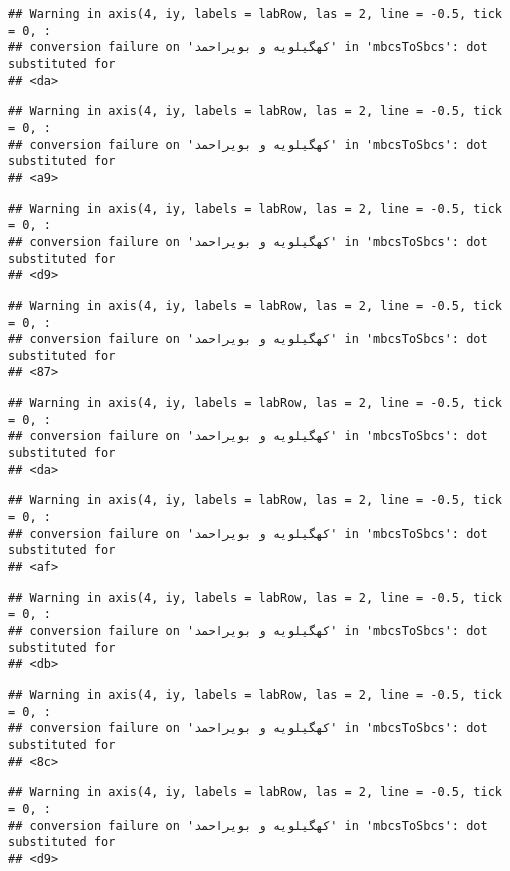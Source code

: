 \documentclass[
]{article}
\begin{document}
\begin{verbatim}
## Warning in axis(4, iy, labels = labRow, las = 2, line = -0.5, tick = 0, :
## conversion failure on 'کهگیلویه و بویراحمد' in 'mbcsToSbcs': dot substituted for
## <da>
\end{verbatim}

\begin{verbatim}
## Warning in axis(4, iy, labels = labRow, las = 2, line = -0.5, tick = 0, :
## conversion failure on 'کهگیلویه و بویراحمد' in 'mbcsToSbcs': dot substituted for
## <a9>
\end{verbatim}

\begin{verbatim}
## Warning in axis(4, iy, labels = labRow, las = 2, line = -0.5, tick = 0, :
## conversion failure on 'کهگیلویه و بویراحمد' in 'mbcsToSbcs': dot substituted for
## <d9>
\end{verbatim}

\begin{verbatim}
## Warning in axis(4, iy, labels = labRow, las = 2, line = -0.5, tick = 0, :
## conversion failure on 'کهگیلویه و بویراحمد' in 'mbcsToSbcs': dot substituted for
## <87>
\end{verbatim}

\begin{verbatim}
## Warning in axis(4, iy, labels = labRow, las = 2, line = -0.5, tick = 0, :
## conversion failure on 'کهگیلویه و بویراحمد' in 'mbcsToSbcs': dot substituted for
## <da>
\end{verbatim}

\begin{verbatim}
## Warning in axis(4, iy, labels = labRow, las = 2, line = -0.5, tick = 0, :
## conversion failure on 'کهگیلویه و بویراحمد' in 'mbcsToSbcs': dot substituted for
## <af>
\end{verbatim}

\begin{verbatim}
## Warning in axis(4, iy, labels = labRow, las = 2, line = -0.5, tick = 0, :
## conversion failure on 'کهگیلویه و بویراحمد' in 'mbcsToSbcs': dot substituted for
## <db>
\end{verbatim}

\begin{verbatim}
## Warning in axis(4, iy, labels = labRow, las = 2, line = -0.5, tick = 0, :
## conversion failure on 'کهگیلویه و بویراحمد' in 'mbcsToSbcs': dot substituted for
## <8c>
\end{verbatim}

\begin{verbatim}
## Warning in axis(4, iy, labels = labRow, las = 2, line = -0.5, tick = 0, :
## conversion failure on 'کهگیلویه و بویراحمد' in 'mbcsToSbcs': dot substituted for
## <d9>
\end{verbatim}
\end{document}
